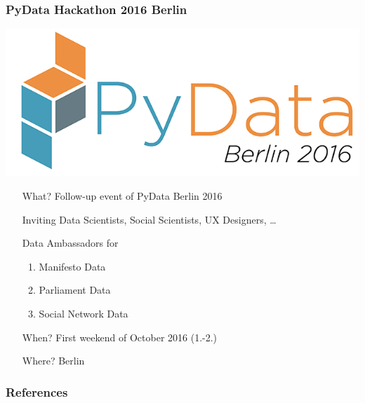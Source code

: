 \documentclass[]{beamer}
\begin{document}
\begin{frame}\frametitle{PyData Hackathon 2016 Berlin}
\centering
\begin{minipage}{0.3\textwidth}
\includegraphics[width=.6\textwidth]{images/pydata-logo-berlin-2016}\\
\end{minipage}
\begin{minipage}{0.6\textwidth}
\small
\begin{itemize}
\item[What?] Follow-up event of PyData Berlin 2016\\
\item[] Inviting Data Scientists, Social Scientists, UX Designers, \dots
\item[] Data Ambassadors for 
\begin{enumerate}
\item Manifesto Data
\item Parliament Data
\item Social Network Data
\end{enumerate}
\item[When?] First weekend of October 2016 (1.-2.)
\item[Where?] Berlin 
\end{itemize}
\end{minipage}
\end{frame}
%
%
\begin{frame}\frametitle{References}


\def\newblock{}
\vspace{2em}
 
\end{frame}
\end{document}
